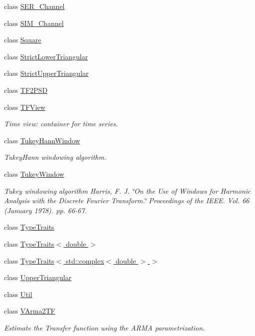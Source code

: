 \begin{DoxyCompactItemize}
class \hyperlink{classtsa_1_1_s_e_r___channel}{S\+E\+R\+\_\+\+Channel}
\item 
class \hyperlink{classtsa_1_1_s_i_m___channel}{S\+I\+M\+\_\+\+Channel}
\item 
class \hyperlink{classtsa_1_1_square}{Square}
\item 
class \hyperlink{classtsa_1_1_strict_lower_triangular}{Strict\+Lower\+Triangular}
\item 
class \hyperlink{classtsa_1_1_strict_upper_triangular}{Strict\+Upper\+Triangular}
\item 
class \hyperlink{classtsa_1_1_t_f2_p_s_d}{T\+F2\+P\+SD}
\item 
class \hyperlink{classtsa_1_1_t_f_view}{T\+F\+View}
\begin{DoxyCompactList}\small\item\em Time view\+: container for time series. \end{DoxyCompactList}\item 
class \hyperlink{classtsa_1_1_tukey_hann_window}{Tukey\+Hann\+Window}
\begin{DoxyCompactList}\small\item\em Tukey\+Hann windowing algorithm. \end{DoxyCompactList}\item 
class \hyperlink{classtsa_1_1_tukey_window}{Tukey\+Window}
\begin{DoxyCompactList}\small\item\em Tukey windowing algorithm Harris, F. J. \char`\"{}\+On the Use of Windows for Harmonic Analysis with the Discrete Fourier Transform.\char`\"{} Proceedings of the I\+E\+EE. Vol. 66 (January 1978). pp. 66-\/67. \end{DoxyCompactList}\item 
class \hyperlink{classtsa_1_1_type_traits}{Type\+Traits}
\item 
class \hyperlink{classtsa_1_1_type_traits_3_01double_01_4}{Type\+Traits$<$ double $>$}
\item 
class \hyperlink{classtsa_1_1_type_traits_3_01std_1_1complex_3_01double_01_4_01_4}{Type\+Traits$<$ std\+::complex$<$ double $>$ $>$}
\item 
class \hyperlink{classtsa_1_1_upper_triangular}{Upper\+Triangular}
\item 
class \hyperlink{classtsa_1_1_util}{Util}
\item 
class \hyperlink{classtsa_1_1_v_arma2_t_f}{V\+Arma2\+TF}
\begin{DoxyCompactList}\small\item\em Estimate the Transfer function using the A\+R\+MA parametrization. \end{DoxyCompactList}\item 

\end{DoxyCompactItemize}

